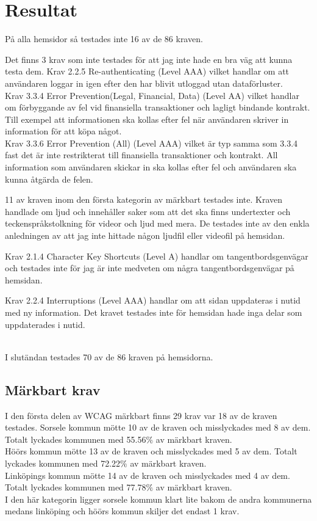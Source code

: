 \documentclass[11p]{article}
\begin{document}
    \section{Resultat}

    På alla hemsidor så testades inte 16 av de 86 kraven.

    Det finns 3 krav som inte testades för att jag inte hade en bra väg att kunna testa dem.
    Krav 2.2.5 Re-authenticating (Level AAA) vilket handlar om att användaren loggar in igen efter den har blivit utloggad utan dataförluster.
   \\ Krav 3.3.4 Error Prevention(Legal, Financial, Data) (Level AA) vilket handlar om förbyggande av fel vid finansiella transaktioner och lagligt bindande kontrakt.
    Till exempel att informationen ska kollas efter fel när användaren skriver in information för att köpa något.
  \\  Krav 3.3.6 Error Prevention (All) (Level AAA) vilket är typ samma som 3.3.4 fast det är inte restrikterat till finansiella transaktioner och kontrakt.
    All information som användaren skickar in ska kollas efter fel och användaren ska kunna åtgärda de felen.

    11 av kraven inom den första kategorin av märkbart testades inte.
    Kraven handlade om ljud och innehåller saker som att det ska finns undertexter och teckenspråkstolkning för videor och ljud med mera.
    De testades inte av den enkla anledningen av att jag inte hittade någon ljudfil eller videofil på hemsidan.

    Krav 2.1.4 Character Key Shortcuts (Level A) handlar om tangentbordsgenvägar och testades inte för jag är inte medveten om några tangentbordsgenvägar på hemsidan.

    Krav 2.2.4 Interruptions (Level AAA) handlar om att sidan uppdateras i nutid med ny information.
    Det kravet testades inte för hemsidan hade inga delar som uppdaterades i nutid.

  \\  I slutändan testades 70 av de 86 kraven på hemsidorna.

    \subsection{Märkbart krav}
    I den första delen av WCAG märkbart finns 29 krav var 18 av de kraven testades.
    Sorsele kommun mötte 10 av de kraven och misslyckades med 8 av dem.
    Totalt lyckades kommunen med 55.56$\%$ av märkbart kraven.
    \\Höörs kommun mötte 13 av de kraven och misslyckades med 5 av dem.
    Totalt lyckades kommunen med 72.22$\%$ av märkbart kraven.
    \\Linköpings kommun mötte 14 av de kraven och misslyckades med 4 av dem.
    Totalt lyckades kommunen med 77.78$\%$ av märkbart kraven.
    \\I den här kategorin ligger sorsele kommun klart lite bakom de andra kommunerna medans linköping och höörs kommun skiljer det endast 1 krav.
\end{document}
